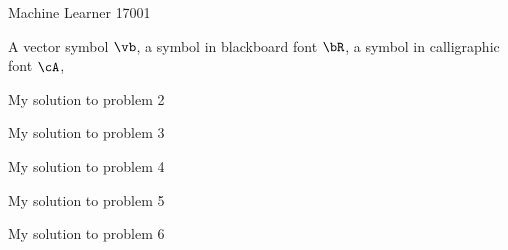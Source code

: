 \documentclass[a4paper,11pt]{article}
\begin{document}
{Machine Learner}   %
{17001}	%

\begin{mlsolution}

A vector symbol $\vb$, a symbol in blackboard font $\bR$, a symbol in calligraphic font $\cA$,   


\end{mlsolution}

\begin{mlsolution} 

My solution to problem 2


\end{mlsolution}

\begin{mlsolution}

My solution to problem 3

\end{mlsolution}

\begin{mlsolution}

My solution to problem 4

\end{mlsolution}
	
\begin{mlsolution}

My solution to problem 5

\end{mlsolution}

\begin{mlsolution}

My solution to problem 6

\end{mlsolution}
\end{document}
